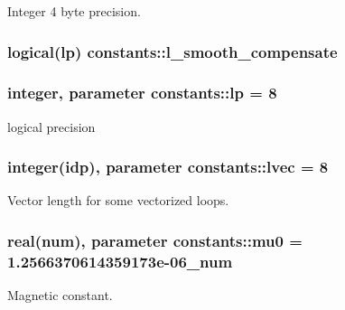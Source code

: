 Integer 4 byte precision. 

\subsubsection[{\texorpdfstring{l\+\_\+smooth\+\_\+compensate}{l_smooth_compensate}}]{\setlength{\rightskip}{0pt plus 5cm}logical({\bf lp}) constants\+::l\+\_\+smooth\+\_\+compensate}\hypertarget{namespaceconstants_a1a543c29c1b8e1fee70164d6704fbbb5}{}\label{namespaceconstants_a1a543c29c1b8e1fee70164d6704fbbb5}
\subsubsection[{\texorpdfstring{lp}{lp}}]{\setlength{\rightskip}{0pt plus 5cm}integer, parameter constants\+::lp = 8}\hypertarget{namespaceconstants_abcbe699dae64804bc375533c0f40c6b1}{}\label{namespaceconstants_abcbe699dae64804bc375533c0f40c6b1}


logical precision 

\subsubsection[{\texorpdfstring{lvec}{lvec}}]{\setlength{\rightskip}{0pt plus 5cm}integer({\bf idp}), parameter constants\+::lvec = 8}\hypertarget{namespaceconstants_a68354913203e3e01c9b0b547e9d95aae}{}\label{namespaceconstants_a68354913203e3e01c9b0b547e9d95aae}


Vector length for some vectorized loops. 

\subsubsection[{\texorpdfstring{mu0}{mu0}}]{\setlength{\rightskip}{0pt plus 5cm}real({\bf num}), parameter constants\+::mu0 = 1.\+2566370614359173e-\/06\+\_\+num}\hypertarget{namespaceconstants_adf2453bfeefbefa1135a81f4ddfe4d6d}{}\label{namespaceconstants_adf2453bfeefbefa1135a81f4ddfe4d6d}


Magnetic constant. 

